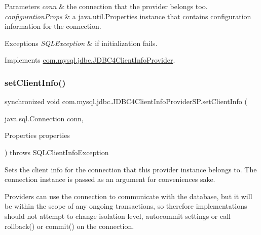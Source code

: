 \begin{DoxyParams}{Parameters}
{\em conn} & the connection that the provider belongs too. \\
\hline
{\em configuration\+Props} & a java.\+util.\+Properties instance that contains configuration information for the connection. \\
\hline
\end{DoxyParams}

\begin{DoxyExceptions}{Exceptions}
{\em S\+Q\+L\+Exception} & if initialization fails. \\
\hline
\end{DoxyExceptions}


Implements \mbox{\hyperlink{interfacecom_1_1mysql_1_1jdbc_1_1_j_d_b_c4_client_info_provider_a6101402e08a2e2062be166fce41ffd71}{com.\+mysql.\+jdbc.\+J\+D\+B\+C4\+Client\+Info\+Provider}}.

\mbox{\label{classcom_1_1mysql_1_1jdbc_1_1_j_d_b_c4_client_info_provider_s_p_a21bba24e53b2d29f6cfa456ea0d75d57}} 
\subsubsection{\texorpdfstring{set\+Client\+Info()}{setClientInfo()}\hspace{0.1cm}{\footnotesize\ttfamily [1/2]}}
{\footnotesize\ttfamily synchronized void com.\+mysql.\+jdbc.\+J\+D\+B\+C4\+Client\+Info\+Provider\+S\+P.\+set\+Client\+Info (\begin{DoxyParamCaption}\item[{java.\+sql.\+Connection}]{conn,  }\item[{Properties}]{properties }\end{DoxyParamCaption}) throws S\+Q\+L\+Client\+Info\+Exception}

Sets the client info for the connection that this provider instance belongs to. The connection instance is passed as an argument for convenience\textquotesingle{}s sake.

Providers can use the connection to communicate with the database, but it will be within the scope of any ongoing transactions, so therefore implementations should not attempt to change isolation level, autocommit settings or call rollback() or commit() on the connection.


